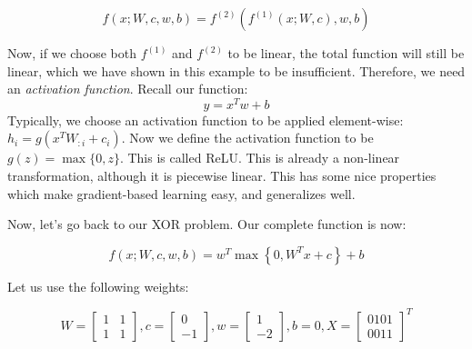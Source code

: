 \[
	f(x; W, c, w, b) = f^{(2)}(f^{(1)}(x; W, c), w, b)
\]

Now, if we choose both $f^{(1)}$ and $f^{(2)}$ to be linear, the total function will still be linear, which we have shown in this example to be insufficient. Therefore, we need an \textit{activation function}. Recall our function:
\[
	y = x^{T}w+b
\]
Typically, we choose an activation function to be applied element-wise: $h_{i} = g(x^{T}W_{:i}+c_{i})$. Now we define the activation function to be $g(z) = \max\{0,z\}$. This is called ReLU. This is already a non-linear transformation, although it is piecewise linear. This  has some nice properties which make gradient-based learning easy, and generalizes well.

Now, let's go back to our XOR problem. Our complete function is now:

\[
	f(x; W, c, w, b) = w^{T}\max \left\{ 0, W^{T}x+c \right\} + b
\]

Let us use the following weights:

\[
	W = \begin{bmatrix}
		1 & 1 \\
		1 & 1
	\end{bmatrix}, c = \begin{bmatrix}
		0 \\
		-1
	\end{bmatrix}, w = \begin{bmatrix}
		1 \\
		-2
	\end{bmatrix}, b = 0, X = \begin{bmatrix}
		0101 \\
		0011
	\end{bmatrix}^{T}
\]

